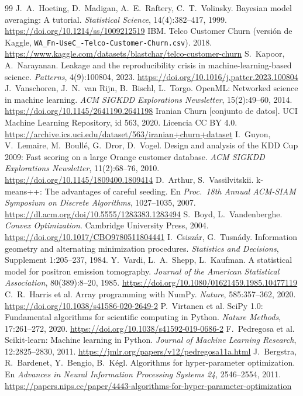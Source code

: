 \documentclass[11pt,a4paper]{article}
\newcommand{\doi}[1]{\url{https://doi.org/#1}}
\begin{document}
\begin{thebibliography}{99}
 J.~A.~Hoeting, D.~Madigan, A.~E.~Raftery, C.~T.~Volinsky. Bayesian model averaging: A tutorial. \emph{Statistical Science}, 14(4):382--417, 1999. \doi{10.1214/ss/1009212519}
 IBM. Telco Customer Churn (versión de Kaggle, \texttt{WA\_Fn-UseC\_-Telco-Customer-Churn.csv}). 2018. \url{https://www.kaggle.com/datasets/blastchar/telco-customer-churn}
 S.~Kapoor, A.~Narayanan. Leakage and the reproducibility crisis in machine-learning-based science. \emph{Patterns}, 4(9):100804, 2023. \doi{10.1016/j.patter.2023.100804}
 J.~Vanschoren, J.~N.~van Rijn, B.~Bischl, L.~Torgo. OpenML: Networked science in machine learning. \emph{ACM SIGKDD Explorations Newsletter}, 15(2):49--60, 2014. \doi{10.1145/2641190.2641198}
 Iranian Churn [conjunto de datos]. UCI Machine Learning Repository, id 563, 2020. Licencia CC BY 4.0. \url{https://archive.ics.uci.edu/dataset/563/iranian+churn+dataset}
 I.~Guyon, V.~Lemaire, M.~Boullé, G.~Dror, D.~Vogel. Design and analysis of the KDD Cup 2009: Fast scoring on a large Orange customer database. \emph{ACM SIGKDD Explorations Newsletter}, 11(2):68--76, 2010. \doi{10.1145/1809400.1809414}
 D.~Arthur, S.~Vassilvitskii. k-means++: The advantages of careful seeding. En \emph{Proc.\ 18th Annual ACM-SIAM Symposium on Discrete Algorithms}, 1027--1035, 2007. \url{https://dl.acm.org/doi/10.5555/1283383.1283494}
 S.~Boyd, L.~Vandenberghe. \emph{Convex Optimization}. Cambridge University Press, 2004. \doi{10.1017/CBO9780511804441}
 I.~Csiszár, G.~Tusnády. Information geometry and alternating minimization procedures. \emph{Statistics and Decisions}, Supplement 1:205--237, 1984.
 Y.~Vardi, L.~A.~Shepp, L.~Kaufman. A statistical model for positron emission tomography. \emph{Journal of the American Statistical Association}, 80(389):8--20, 1985. \doi{10.1080/01621459.1985.10477119}
 C.~R.~Harris et al. Array programming with NumPy. \emph{Nature}, 585:357--362, 2020. \doi{10.1038/s41586-020-2649-2}
 P.~Virtanen et al. SciPy 1.0: Fundamental algorithms for scientific computing in Python. \emph{Nature Methods}, 17:261--272, 2020. \doi{10.1038/s41592-019-0686-2}
 F.~Pedregosa et al. Scikit-learn: Machine learning in Python. \emph{Journal of Machine Learning Research}, 12:2825--2830, 2011. \url{https://jmlr.org/papers/v12/pedregosa11a.html}
 J.~Bergstra, R.~Bardenet, Y.~Bengio, B.~Kégl. Algorithms for hyper-parameter optimization. En \emph{Advances in Neural Information Processing Systems 24}, 2546--2554, 2011. \url{https://papers.nips.cc/paper/4443-algorithms-for-hyper-parameter-optimization}

\end{thebibliography}
\end{document}
